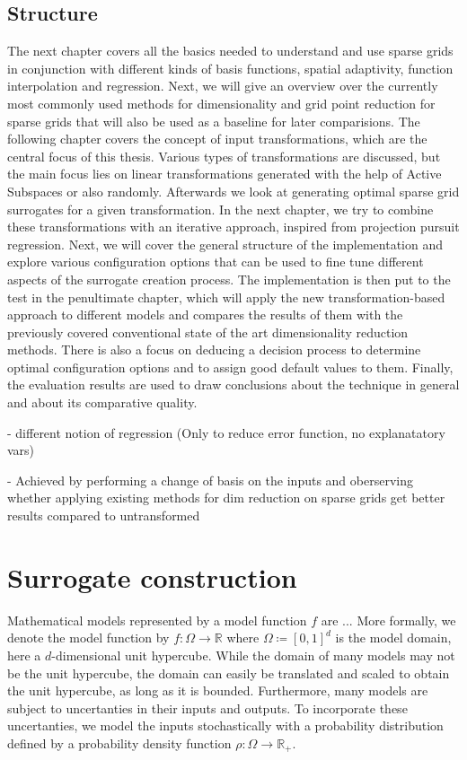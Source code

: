 \documentclass[
  a4paper,  %
  twoside,  %
  bibliography=totoc,
  headsepline,
  cleardoublepage=empty,
  parskip=half,
  draft=false
]{scrbook}
\begin{document}
\section{Structure}

The next chapter covers all the basics needed to understand and use sparse grids in conjunction with different kinds of basis functions, spatial adaptivity, function interpolation and regression.
Next, we will give an overview over the currently most commonly used methods for dimensionality and grid point reduction for sparse grids that will also be used as a baseline for later comparisions.
The following chapter covers the concept of input transformations, which are the central focus of this thesis.
Various types of transformations are discussed, but the main focus lies on linear transformations generated with the help of Active Subspaces or also randomly.
Afterwards we look at generating optimal sparse grid surrogates for a given transformation.
In the next chapter, we try to combine these transformations with an iterative approach, inspired from projection pursuit regression.
Next, we will cover the general structure of the implementation and explore various configuration options that can be used to fine tune different aspects of the surrogate creation process.
The implementation is then put to the test in the penultimate chapter, which will apply the new transformation-based approach to different models and compares the results of them with the previously covered conventional state of the art dimensionality reduction methods.
There is also a focus on deducing a decision process to determine optimal configuration options and to assign good default values to them.
Finally, the evaluation results are used to draw conclusions about the technique in general and about its comparative quality.

- different notion of regression (Only to reduce error function, no explanatatory vars)

- Achieved by performing a change of basis on the inputs and oberserving whether applying existing methods for dim reduction on sparse grids get better results compared to untransformed

\chapter{Surrogate construction}
\label{chap:c2}

Mathematical models represented by a model function $f$ are ...
More formally, we denote the model function by $f \colon \Omega \to \mathds{R}$ where $\Omega \coloneqq [0,1]^d$ is the model domain, here a $d$-dimensional unit hypercube.
While the domain of many models may not be the unit hypercube, the domain can easily be translated and scaled to obtain the unit hypercube, as long as it is bounded.
Furthermore, many models are subject to uncertanties in their inputs and outputs.
To incorporate these uncertanties, we model the inputs stochastically with a probability distribution defined by a probability density function $\rho \colon \Omega \to \mathds{R_+}$.
\end{document}
